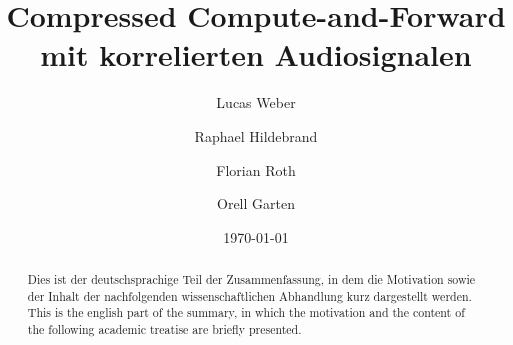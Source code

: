 \documentclass[ngerman]{tudscrreprt}
\begin{document}
\date{\today}
\title{Compressed Compute-and-Forward mit korrelierten Audiosignalen}
\subject{}

\author{%
	Lucas Weber
	\and%
	Raphael Hildebrand
	\and%
	Florian Roth
	\and%
	Orell Garten
}

\maketitle




\begin{abstract}
 Dies ist der deutschsprachige Teil der Zusammenfassung, in dem die
 Motivation sowie der Inhalt der nachfolgenden wissenschaftlichen
 Abhandlung kurz dargestellt werden.
\nextabstract[english]
 This is the english part of the summary, in which the motivation and
 the content of the following academic treatise are briefly presented.
\end{abstract}

\confirmation

\tableofcontents

\listoffigures



\printbibliography
\end{document}
